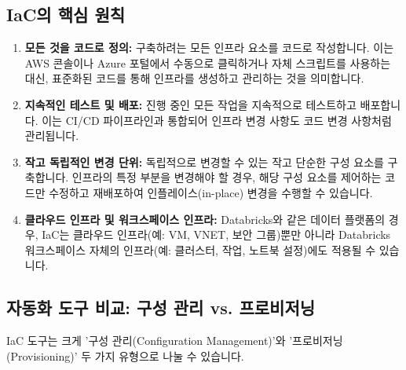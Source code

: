 \documentclass[11pt,a4paper]{article}
\begin{document}
\subsection{IaC의 핵심 원칙}
\begin{enumerate}
    \item \textbf{모든 것을 코드로 정의:}
    구축하려는 모든 인프라 요소를 코드로 작성합니다. 이는 AWS 콘솔이나 Azure 포털에서 수동으로 클릭하거나 자체 스크립트를 사용하는 대신, 표준화된 코드를 통해 인프라를 생성하고 관리하는 것을 의미합니다.

    \item \textbf{지속적인 테스트 및 배포:}
    진행 중인 모든 작업을 지속적으로 테스트하고 배포합니다. 이는 CI/CD 파이프라인과 통합되어 인프라 변경 사항도 코드 변경 사항처럼 관리됩니다.

    \item \textbf{작고 독립적인 변경 단위:}
    독립적으로 변경할 수 있는 작고 단순한 구성 요소를 구축합니다. 인프라의 특정 부분을 변경해야 할 경우, 해당 구성 요소를 제어하는 코드만 수정하고 재배포하여 인플레이스(in-place) 변경을 수행할 수 있습니다.

    \item \textbf{클라우드 인프라 및 워크스페이스 인프라:}
    Databricks와 같은 데이터 플랫폼의 경우, IaC는 클라우드 인프라(예: VM, VNET, 보안 그룹)뿐만 아니라 Databricks 워크스페이스 자체의 인프라(예: 클러스터, 작업, 노트북 설정)에도 적용될 수 있습니다.
\end{enumerate}

\subsection{자동화 도구 비교: 구성 관리 vs. 프로비저닝}
IaC 도구는 크게 '구성 관리(Configuration Management)'와 '프로비저닝(Provisioning)' 두 가지 유형으로 나눌 수 있습니다.
\end{document}
